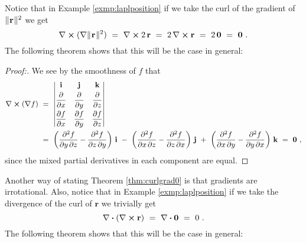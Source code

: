 Notice that in Example \ref{exmp:laplposition} if we take the curl of the gradient of $\lVert\mspace{1mu}\textbf{r}\mspace{1mu}\rVert^2$ we get
\begin{displaymath}
 \nabla \bm{\times} ( \nabla \lVert\mspace{1mu}\textbf{r}\mspace{1mu}\rVert^2 ) ~=~ \nabla \bm{\times} 2\,\textbf{r} ~=~
 2\,\nabla \bm{\times} \textbf{r} ~=~ 2\,\textbf{0} ~=~ \textbf{0} ~.
\end{displaymath}
The following theorem shows that this will be the case in general:

\begin{proofbar}\vspace{-3mm}\begin{proof}[Proof:]
 We see by the smoothness of $f$ that
 \begin{align*}
  \Crossprod{\nabla}{(\nabla f)} ~&=~ \begin{vmatrix}
   \textbf{i} & \textbf{j} & \textbf{k} \vspace{1mm}\\ \dfrac{\partial}{\partial x} & \dfrac{\partial}{\partial y} &
    \dfrac{\partial}{\partial z} \vspace{1mm}\\
   \dfrac{\partial f}{\partial x} & \dfrac{\partial f}{\partial y} & \dfrac{\partial f}{\partial z}
   \end{vmatrix}\\
  &=~ \left( \frac{\partial^2 f}{\partial y\,\partial z}-\frac{\partial^2 f}{\partial z\,\partial y} \right) \,\textbf{i}
   ~-~ \left( \frac{\partial^2 f}{\partial x\,\partial z}-\frac{\partial^2 f}{\partial z\,\partial x} \right) \,\textbf{j}
   ~+~ \left( \frac{\partial^2 f}{\partial x\,\partial y}-\frac{\partial^2 f}{\partial y\,\partial x} \right) \,\textbf{k}
  ~=~ \textbf{0} ~,
 \end{align*}
 since the mixed partial derivatives in each component are equal.\vspace{-3mm}
\end{proof}\end{proofbar}


Another way of stating Theorem \ref{thm:curlgrad0} is that gradients are irrotational. Also,
notice that in Example \ref{exmp:laplposition} if we take the divergence of the curl of $\textbf{r}$ we trivially get
\begin{displaymath}
 \nabla \bm{\cdot} (\nabla \bm{\times} \textbf{r}) ~=~ \nabla \bm{\cdot} \textbf{0} ~=~ 0 ~.
\end{displaymath}
The following theorem shows that this will be the case in general:


